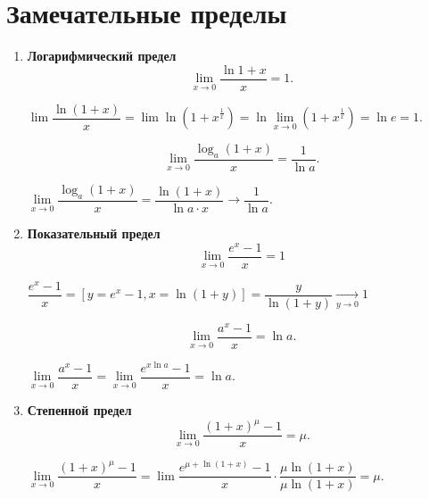 \section{Замечательные пределы}
\begin{enumerate}
	\item \textbf{Логарифмический предел}
	$$\underset{x \rightarrow 0}{\lim}{\dfrac{\ln{1+x}}{x}} = 1.$$
	\begin{Proof}
		$\lim{\dfrac{\ln{(1+x)}}{x}} = \lim{\ln({1+x}^{\frac{1}{x}})} = \ln{\underset{x \rightarrow 0}{\lim}({1+x}^{\frac{1}{x}})} = \ln{e} = 1$.
	\end{Proof}
	\begin{corollary}
		$$\underset{x \rightarrow 0}{\lim}{\dfrac{\log_{a}(1+x)}{x}} = \dfrac{1}{\ln{a}}.$$
	\end{corollary}
	\begin{Proof}
		$\underset{x \rightarrow 0}{\lim}{\dfrac{\log_{a}(1+x)}{x}} = \dfrac{\ln{(1+x)}}{\ln{a} \cdot x} \to \dfrac{1}{\ln{a}}.$
	\end{Proof}
	\item \textbf{Показательный предел}
	$$\underset{x \rightarrow 0}{\lim}{\dfrac{e^x-1}{x}} = 1$$
	\begin{Proof}
		$\dfrac{e^x-1}{x} = [ y = e^x-1, x= \ln{(1+y)}] = \dfrac{y}{\ln{(1+y)}} \xrightarrow[y \rightarrow 0]{} 1$
	\end{Proof}
	\begin{corollary}
		$$\underset{x \rightarrow 0}{\lim}{\dfrac{a^x-1}{x}} = \ln{a}.$$
	\end{corollary}
	\begin{Proof}
		$\underset{x \rightarrow 0}{\lim}{\dfrac{a^x-1}{x}} = \underset{x \rightarrow 0}{\lim}{\dfrac{e^{x \ln{a}}-1}{x}} = \ln{a}.$
	\end{Proof}
	\item \textbf{Степенной предел}
	$$\underset{x \rightarrow 0}{\lim}{\dfrac{(1+x)^{\mu}-1}{x}} = \mu.$$
	\begin{Proof}
		$\underset{x \rightarrow 0}{\lim}{\dfrac{(1+x)^{\mu}-1}{x}} = \lim{\dfrac{e^{\mu + \ln(1+x)}-1}{x}} \cdot \dfrac{\mu \ln{(1+x)}}{\mu \ln(1+x)} = \mu.$
	\end{Proof}
\end{enumerate}
